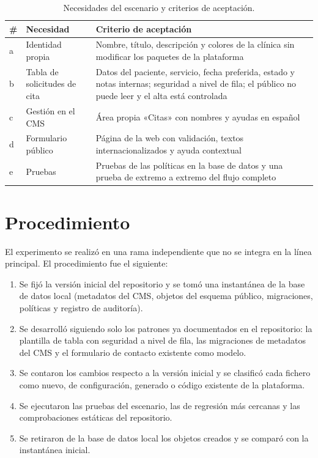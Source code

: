 \begin{table}[htbp]
  \centering
  \footnotesize
  \caption{Necesidades del escenario y criterios de aceptación.}
  \label{tab:eval-necesidades}
  \begin{tabularx}{\textwidth}{@{}l>{\raggedright\arraybackslash}p{3.6cm}X@{}}
    \toprule
    \textbf{\#} & \textbf{Necesidad} & \textbf{Criterio de aceptación} \\
    \midrule
    a & Identidad propia & Nombre, título, descripción y colores de la
      clínica sin modificar los paquetes de la plataforma \\
    b & Tabla de solicitudes de cita & Datos del paciente, servicio, fecha
      preferida, estado y notas internas; seguridad a nivel de fila; el
      público no puede leer y el alta está controlada \\
    c & Gestión en el CMS & Área propia «Citas» con nombres y ayudas en
      español \\
    d & Formulario público & Página de la web con validación, textos
      internacionalizados y ayuda contextual \\
    e & Pruebas & Pruebas de las políticas en la base de datos y una prueba
      de extremo a extremo del flujo completo \\
    \bottomrule
  \end{tabularx}
\end{table}

\section{Procedimiento}
\label{sec:eval-procedimiento}

El experimento se realizó en una rama independiente que no se integra en la
línea principal. El procedimiento fue el siguiente:

\begin{enumerate}
  \item Se fijó la versión inicial del repositorio y se tomó una
    instantánea de la base de datos local (metadatos del CMS, objetos del
    esquema público, migraciones, políticas y registro de auditoría).
  \item Se desarrolló siguiendo solo los patrones ya documentados en el
    repositorio: la plantilla de tabla con seguridad a nivel de fila, las
    migraciones de metadatos del CMS y el formulario de contacto existente
    como modelo.
  \item Se contaron los cambios respecto a la versión inicial y se
    clasificó cada fichero como nuevo, de configuración, generado o código
    existente de la plataforma.
  \item Se ejecutaron las pruebas del escenario, las de regresión más
    cercanas y las comprobaciones estáticas del repositorio.
  \item Se retiraron de la base de datos local los objetos creados y se
    comparó con la instantánea inicial.
\end{enumerate}

